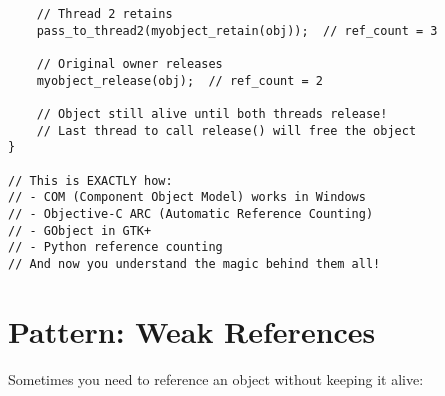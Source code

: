 \begin{lstlisting}
    // Thread 2 retains
    pass_to_thread2(myobject_retain(obj));  // ref_count = 3

    // Original owner releases
    myobject_release(obj);  // ref_count = 2

    // Object still alive until both threads release!
    // Last thread to call release() will free the object
}

// This is EXACTLY how:
// - COM (Component Object Model) works in Windows
// - Objective-C ARC (Automatic Reference Counting)
// - GObject in GTK+
// - Python reference counting
// And now you understand the magic behind them all!
\end{lstlisting}

\section{Pattern: Weak References}

Sometimes you need to reference an object without keeping it alive:

